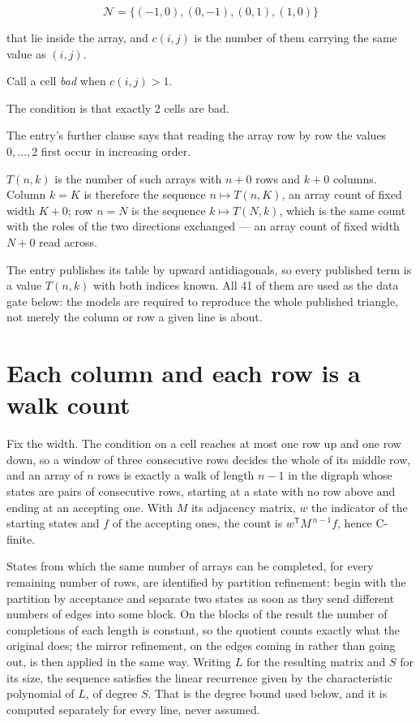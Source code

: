 \documentclass[11pt]{article}
\theoremstyle{definition}
\begin{document}
\[\mathcal{N} = \{(-1,0), (0,-1), (0,1), (1,0)\}\]

that lie inside the array, and $c(i,j)$ is the number of them carrying the same value as $(i,j)$.

Call a cell {\itshape bad} when $c(i,j) > 1$.

The condition is that exactly 2 cells are bad.

The entry's further clause says that reading the array row by row the values $0,\dots,2$ first occur in increasing order.

$T(n,k)$ is the number of such arrays with $n + 0$ rows and $k + 0$ columns. Column $k = K$ is therefore the sequence $n \mapsto T(n,K)$, an array count of fixed width $K + 0$; row $n = N$ is the sequence $k \mapsto T(N,k)$, which is the same count with the roles of the two directions exchanged --- an array count of fixed width $N + 0$ read across.

The entry publishes its table by upward antidiagonals, so every published term is a value $T(n,k)$ with both indices known. All 41 of them are used as the data gate below: the models are required to reproduce the whole published triangle, not merely the column or row a given line is about.

\section{Each column and each row is a walk count}

Fix the width. The condition on a cell reaches at most one row up and one row down, so a window of three consecutive rows decides the whole of its middle row, and an array of $n$ rows is exactly a walk of length $n-1$ in the digraph whose states are pairs of consecutive rows, starting at a state with no row above and ending at an accepting one. With $M$ its adjacency matrix, $w$ the indicator of the starting states and $f$ of the accepting ones, the count is $w^{\mathsf T}M^{\,n-1}f$, hence C-finite.

States from which the same number of arrays can be completed, for every remaining number of rows, are identified by partition refinement: begin with the partition by acceptance and separate two states as soon as they send different numbers of edges into some block. On the blocks of the result the number of completions of each length is constant, so the quotient counts exactly what the original does; the mirror refinement, on the edges coming in rather than going out, is then applied in the same way. Writing $L$ for the resulting matrix and $S$ for its size, the sequence satisfies the linear recurrence given by the characteristic polynomial of $L$, of degree $S$. That is the degree bound used below, and it is computed separately for every line, never assumed.
\end{document}
